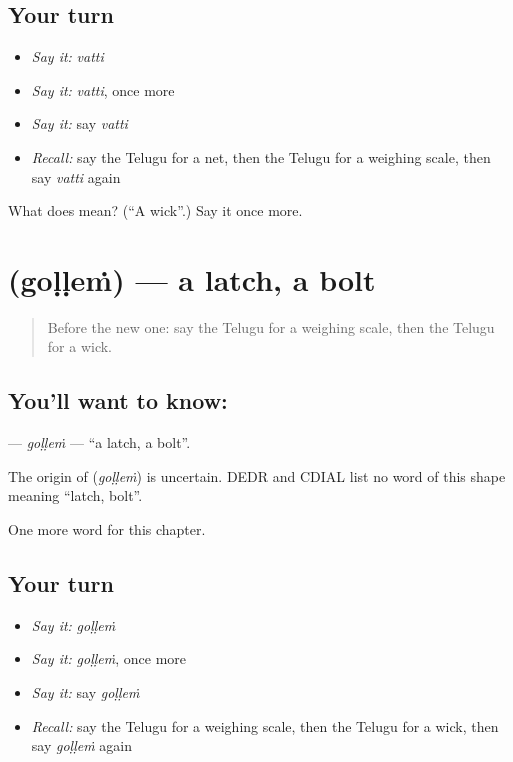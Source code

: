 \subsection*{Your turn}
\begin{itemize}
\raggedright
  \item \emph{Say it:} \emph{vatti}
  \item \emph{Say it:} \emph{vatti}, once more
  \item \emph{Say it:} say \emph{vatti}
  \item \emph{Recall:} say the Telugu for a net, then the Telugu for a weighing scale, then say \emph{vatti} again
\end{itemize}

\begin{tcolorbox}[breakable,colback=teal!4,colframe=teal!35!black,title={Before you move on}]
What does  mean? (\textquotedblleft{}A wick\textquotedblright{}.) Say it once more.
\end{tcolorbox}
\section[\texorpdfstring{\te{గొళ్ళెం} (goḷḷeṁ)}{గొళ్ళెం (goḷḷeṁ)}]{ (goḷḷeṁ) — a latch, a bolt}

\label{lesson:TE-C192-gollem}



\begin{quote}
Before the new one: say the Telugu for a weighing scale, then the Telugu for a wick.
\end{quote}

\subsection*{You'll want to know: }
\textbf{} — \emph{goḷḷeṁ} — \textquotedblleft{}a latch, a bolt\textquotedblright{}.

\begin{cousinweb}
The origin of \textbf{} (\emph{goḷḷeṁ}) is uncertain. DEDR and CDIAL list no word of this shape meaning \textquotedblleft{}latch, bolt\textquotedblright{}.
\end{cousinweb}

\begin{grammarlens}[title={What you've built}]
One more word for this chapter.
\end{grammarlens}

\subsection*{Your turn}
\begin{itemize}
\raggedright
  \item \emph{Say it:} \emph{goḷḷeṁ}
  \item \emph{Say it:} \emph{goḷḷeṁ}, once more
  \item \emph{Say it:} say \emph{goḷḷeṁ}
  \item \emph{Recall:} say the Telugu for a weighing scale, then the Telugu for a wick, then say \emph{goḷḷeṁ} again
\end{itemize}

